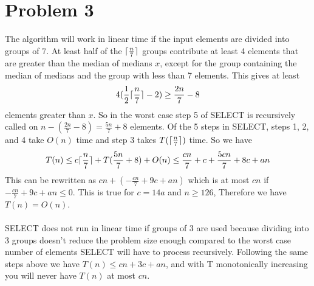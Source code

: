 \documentclass{article}
\DeclarePairedDelimiter{\ceil}{\lceil}{\rceil}
\begin{document}
\section*{Problem 3}
The algorithm will work in linear time if the input elements are divided into groups of 7.  At least half of the $\ceil{\frac{n}{7}}$ groups contribute at least 4 elements that are greater than the median of medians $x$, except for the group containing the median of medians and the group with less than 7 elements.  This gives at least $$4(\frac{1}{2}\ceil{\frac{n}{7}} -2) \geq \frac{2n}{7} -8$$ elements greater than $x$. So in the worst case step 5 of SELECT is recursively called on $n-(\frac{2n}{7}-8)=\frac{5n}{7}+8$ elements. Of the 5 steps in SELECT, steps 1, 2, and 4 take $O(n)$ time and step 3 takes $T(\ceil{\frac{n}{7}})$ time. So we have $$T(n) \leq c\ceil{\frac{n}{7}}+T(\frac{5n}{7}+8)+O(n) \leq \frac{cn}{7}+c+\frac{5cn}{7}+8c+an$$ This can be rewritten as $cn+(-\frac{cn}{7}+9c+an)$ which is at most $cn$ if $-\frac{cn}{7}+9c+an \leq 0$.  This is true for $c=14a$ and $n\geq126$, Therefore we have $T(n)=O(n)$.\\\\
SELECT does not run in linear time if groups of 3 are used because dividing into 3 groups doesn't reduce the problem size enough compared to the worst case number of elements SELECT will have to process recursively.  Following the same steps above we have $T(n) \leq cn +3c +an$, and with T monotonically increasing you will never have $T(n)$ at most $cn$.
\end{document}
